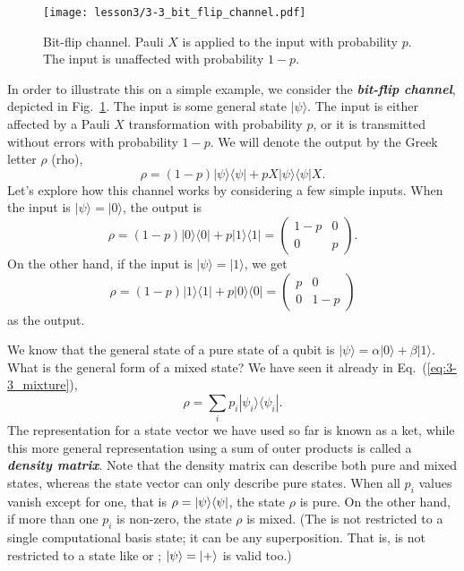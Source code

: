 \begin{figure}[t]
    \centering
    \texttt{[image: lesson3/3-3\_bit\_flip\_channel.pdf]}
    \caption[Bit-flip channel]{Bit-flip channel. Pauli $X$ is applied to the input with probability $p$. The input is unaffected with probability $1-p$.}
    \label{fig:3-3_bit_flip_channel}
\end{figure}
In order to illustrate this on a simple example, we consider the  \textbf{\emph{bit-flip channel}}, depicted in Fig.~\ref{fig:3-3_bit_flip_channel}.
The input is some general state $|\psi\rangle$.
The input is either affected by a Pauli $X$ transformation with probability $p$, or it is transmitted without errors with probability $1-p$.
We will denote the output by the Greek letter $\rho$ (rho),
\begin{equation}
    \rho = (1-p) |\psi\rangle\langle\psi| + p X|\psi\rangle\langle\psi|X.
    \label{eq:3-3_bit_flip}
\end{equation}
Let's explore how this channel works by considering a few simple inputs.
When the input is $|\psi\rangle = |0\rangle$, the output is
\begin{equation}
    \rho = (1-p)|0\rangle\langle0| + p|1\rangle\langle1| = \begin{pmatrix} 1-p & 0 \\ 0 & p \end{pmatrix}.
\end{equation}
On the other hand, if the input is $|\psi\rangle=|1\rangle$, we get
\begin{equation}
    \rho = (1-p)|1\rangle\langle1| + p|0\rangle\langle0| = \begin{pmatrix} p & 0 \\ 0 & 1-p \end{pmatrix}
\end{equation}
as the output.

We know that the general state of a pure state of a qubit is $|\psi\rangle = \alpha|0\rangle + \beta|1\rangle$.
What is the general form of a mixed state?
We have seen it already in Eq.~(\ref{eq:3-3_mixture}),
\begin{equation}
    \rho = \sum_i p_i |\psi_i\rangle\langle\psi_i|.
    \label{eq:general_mixed_state}
\end{equation}
The representation for a state vector we have used so far is known as a ket, while this more general representation using a sum of outer products is called a \textbf{\emph{density matrix}}.
Note that the density matrix can describe both pure and mixed states, whereas the state vector can only describe pure states.
When all $p_i$ values vanish except for one, that is $\rho=|\psi \rangle \langle \psi|$, the state $\rho$ is pure.
On the other hand, if more than one $p_i$ is non-zero, the state $\rho$ is mixed.  (The \ket{\psi} is not restricted to a single computational basis state; it can be any superposition.  That is, \ket{\psi} is not restricted to a state like  or ; $\left| \psi \right\rangle = \left| + \right\rangle$ is valid too.)

